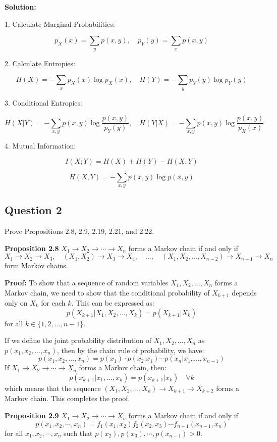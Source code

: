 \documentclass[a4paper,10pt]{article}
\begin{document}
\textbf{Solution:}

1. Calculate Marginal Probabilities:

$$
p_X(x) = \sum_{y} p(x, y), \quad p_Y(y) = \sum_{x} p(x, y)
$$

2. Calculate Entropies:

$$
H(X) = -\sum_{x} p_X(x) \log p_X(x), \quad H(Y) = -\sum_{y} p_Y(y) \log p_Y(y)
$$

3. Conditional Entropies:

$$
H(X|Y) = -\sum_{x, y} p(x, y) \log \frac{p(x, y)}{p_Y(y)}, \quad H(Y|X) = -\sum_{x, y} p(x, y) \log \frac{p(x, y)}{p_X(x)}
$$

4. Mutual Information:

$$
I(X; Y) = H(X) + H(Y) - H(X, Y)
$$

$$
H(X, Y) = -\sum_{x, y} p(x, y) \log p(x, y)
$$

\subsection*{Question 2}
Prove Propositions 2.8, 2.9, 2.19, 2.21, and 2.22.

\textbf{Proposition 2.8}
$X_1 \to X_2 \to \cdots \to X_n$ forms a Markov chain if and only if
$$
X_1 \to X_2 \to X_3, \quad (X_1, X_2) \to X_3 \to X_4, \quad \ldots, \quad (X_1, X_2, \ldots, X_{n-2}) \to X_{n-1} \to X_n
$$
form Markov chains.

\textbf{Proof:}
To show that a sequence of random variables $X_1, X_2, \ldots, X_n$ forms a Markov chain, we need to show that the conditional probability of $X_{k+1}$ depends only on $X_k$ for each $k$. This can be expressed as:
$$
p(X_{k+1} | X_1, X_2, \ldots, X_k) = p(X_{k+1} | X_k)
$$
for all $k \in \{1, 2, \ldots, n-1\}$.

If we define the joint probability distribution of $X_1, X_2, \ldots, X_n$ as $p(x_1, x_2, \ldots, x_n)$, then by the chain rule of probability, we have:
$$
p(x_1, x_2, \ldots, x_n) = p(x_1) \cdot p(x_2|x_1) \cdots p(x_n|x_1, \ldots, x_{n-1})
$$
If $X_1 \to X_2 \to \cdots \to X_n$ forms a Markov chain, then:
$$
p(x_{k+1} | x_1, \ldots, x_k) = p(x_{k+1} | x_k) \quad \forall k
$$
which means that the sequence $(X_1, X_2, \ldots, X_{k}) \to X_{k+1} \to X_{k+2}$ forms a Markov chain. This completes the proof.

\textbf{Proposition 2.9}
$X_1 \to X_2 \to \cdots \to X_n$ forms a Markov chain if and only if
$$
p(x_1, x_2, \cdots, x_n) = f_1(x_1, x_2) f_2(x_2, x_3) \cdots f_{n-1}(x_{n-1}, x_n)
$$
for all $x_1, x_2, \cdots, x_n$ such that $p(x_2), p(x_3), \cdots, p(x_{n-1}) > 0$.
\end{document}
